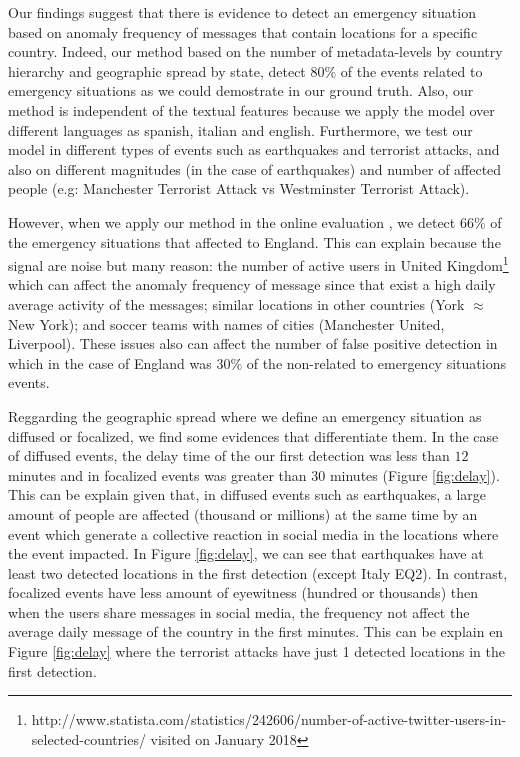\documentclass[sigconf]{acmart}
\begin{document}
Our findings suggest that there is evidence to detect an emergency situation based on anomaly frequency of messages that contain locations for a specific country. Indeed, our method based on the number of metadata-levels by country hierarchy and geographic spread by state, detect $80\%$ of the events related to emergency situations as we could demostrate in our ground truth. Also, our method is independent of the textual features because we apply the model over different languages as spanish, italian and english. Furthermore, we test our model in different types of events such as earthquakes and terrorist attacks, and also on different magnitudes (in the case of earthquakes) and number of affected people (e.g: Manchester Terrorist Attack vs Westminster Terrorist Attack).

However, when we apply our method in the online evaluation , we detect $66\%$ of the emergency situations that affected to England. This can explain because the signal are noise but many reason: the number of active users in United Kingdom\footnote{http://www.statista.com/statistics/242606/number-of-active-twitter-users-in-selected-countries/ visited on January 2018} which can affect the anomaly frequency of message since that exist a high daily average activity of the messages; similar locations in other countries (York $\approx$ New York); and soccer teams with names of cities (Manchester United, Liverpool). These issues also can affect the number of false positive detection in which in the case of England was $30\%$ of the non-related to emergency situations events.

Reggarding the geographic spread where we define an emergency situation as diffused or focalized, we find some evidences that differentiate them. In the case of diffused events, the delay time of the our first detection was less than $12$ minutes and in focalized events was greater than $30$ minutes (Figure \ref{fig:delay}). This can be explain given that, in diffused events such as earthquakes, a large amount of people are affected (thousand or millions) at the same time by an event which generate a collective reaction in social media in the locations where the event impacted. In Figure \ref{fig:delay}, we can see that earthquakes have at least two detected locations in the first detection (except Italy EQ2). In contrast, focalized events have less amount of eyewitness (hundred or thousands) then when the users share messages in social media, the frequency not affect the average daily message of the country in the first minutes. This can be explain en Figure \ref{fig:delay} where the terrorist attacks have just 1 detected locations in the first detection.
\end{document}
